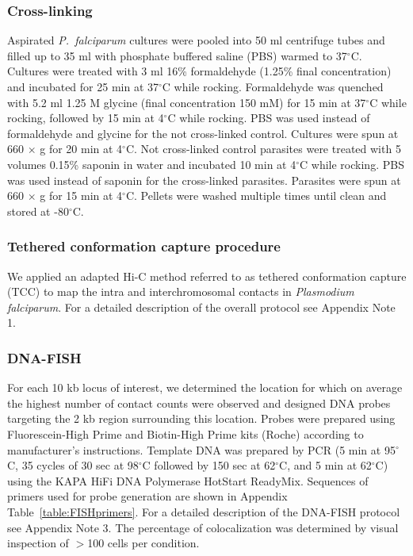 \subsubsection{Cross-linking}
Aspirated {\em P.\ falciparum} cultures were pooled into 50 ml centrifuge
tubes and filled up to 35 ml with phosphate buffered saline (PBS) warmed
to 37$^\circ$C. Cultures were treated with 3 ml 16\% formaldehyde
(1.25\% final concentration) and incubated for 25 min at 37$^\circ$C while rocking.
Formaldehyde was quenched with 5.2 ml 1.25 M glycine (final concentration 150 mM)
for 15 min at 37$^\circ$C while rocking, followed by 15 min at 4$^\circ$C while
rocking. PBS was used instead of formaldehyde and glycine for the not cross-linked
control. Cultures were spun at 660 $\times$ g for 20 min at 4$^\circ$C. Not
cross-linked control parasites were treated with 5 volumes 0.15\% saponin in water
and incubated 10 min at 4$^\circ$C while rocking. PBS was used instead of saponin
for the cross-linked parasites. Parasites were spun at 660 $\times$ g for 15 min
at 4$^\circ$C. Pellets were washed multiple times until clean and stored at -80$^\circ$C.

\subsubsection{Tethered conformation capture procedure}
We applied an adapted Hi-C method referred to as tethered conformation capture
(TCC) \citep{kalhor:genome} to map the intra and interchromosomal contacts in
{\em Plasmodium falciparum}. For a detailed description of the overall protocol
see Appendix Note 1.

\subsubsection{DNA-FISH}
For each 10 kb locus of interest, we determined the location for which on average
the highest number of contact counts were observed and designed DNA probes targeting
the 2 kb region surrounding this location. Probes were prepared using Fluorescein-High
Prime and Biotin-High Prime kits (Roche) according to manufacturer's instructions.
Template DNA was prepared by PCR (5 min at 95$^\circ$C, 35 cycles of 30 sec at
98$^\circ$C followed by 150 sec at 62$^\circ$C, and 5 min at 62$^\circ$C) using
the KAPA HiFi DNA Polymerase HotStart ReadyMix. Sequences of primers used for probe
generation are shown in Appendix Table~\ref{table:FISHprimers}. For a detailed
description of the DNA-FISH protocol see Appendix Note 3. The percentage of
colocalization was determined by visual inspection of $>$100 cells per condition.

